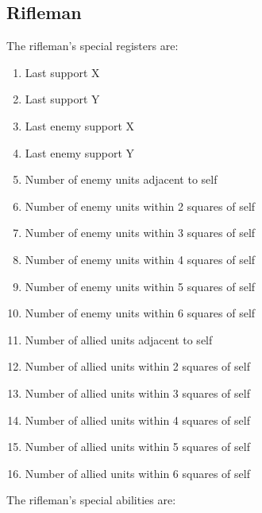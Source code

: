 \documentclass{article}
\begin{document}
\subsection*{Rifleman}

The rifleman's special registers are:

\begin{enumerate}[noitemsep]
    \item Last support X
    \item Last support Y
    \item Last enemy support X
    \item Last enemy support Y
    \item Number of enemy units adjacent to self
    \item Number of enemy units within 2 squares of self
    \item Number of enemy units within 3 squares of self
    \item Number of enemy units within 4 squares of self
    \item Number of enemy units within 5 squares of self
    \item Number of enemy units within 6 squares of self
    \item Number of allied units adjacent to self
    \item Number of allied units within 2 squares of self
    \item Number of allied units within 3 squares of self
    \item Number of allied units within 4 squares of self
    \item Number of allied units within 5 squares of self
    \item Number of allied units within 6 squares of self
\end{enumerate}

The rifleman's special abilities are:
\end{document}
